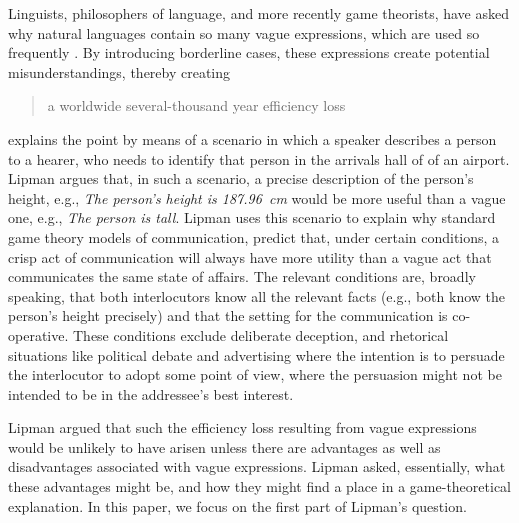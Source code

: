 \documentclass[graybox,envcountchap,sectrefs%
,footinfo
]{svmono}
\begin{document}
Linguists, philosophers of language, and more recently game theorists, have asked why natural languages contain so many vague expressions, which are used so frequently \citep{Lipman:2000fk, lipmanvague}. By introducing borderline cases, these expressions create potential misunderstandings, thereby creating \begin{quotation}a worldwide several-thousand year efficiency loss \citep[p.\ 1]{lipmanvague}\end{quotation} \citeauthor{lipmanvague} explains the point by means of a scenario in which a speaker describes a person to a hearer, who needs to identify that person in the arrivals hall of of an airport. Lipman argues that, in such a scenario, a precise description of the person's height, e.g., \textsl{The person's height is 187.96~cm} would be more useful than a vague one, e.g., \textsl{The person is tall}. Lipman uses this scenario to explain why standard game theory models of communication, \citep[e.g.][]{Crawford:1982lr} predict that, under certain conditions, a crisp act of communication will always have more utility than a vague act that communicates the same state of affairs. The relevant conditions are, broadly speaking, that both interlocutors know all the relevant facts (e.g., both know the person's height precisely) and that the setting for the communication is co-operative. These conditions exclude deliberate deception, and rhetorical situations like political debate and advertising where the intention is to persuade the interlocutor to adopt some point of view, where the persuasion might not be intended to be in the addressee's best interest. 

Lipman argued that such the efficiency loss resulting from vague expressions would be unlikely to have arisen unless there are advantages as well as disadvantages associated with vague expressions. Lipman asked, essentially, what these advantages might be, and how they might find a place in a game-theoretical explanation. In this paper, we focus on the first part of Lipman's question.
\end{document}
